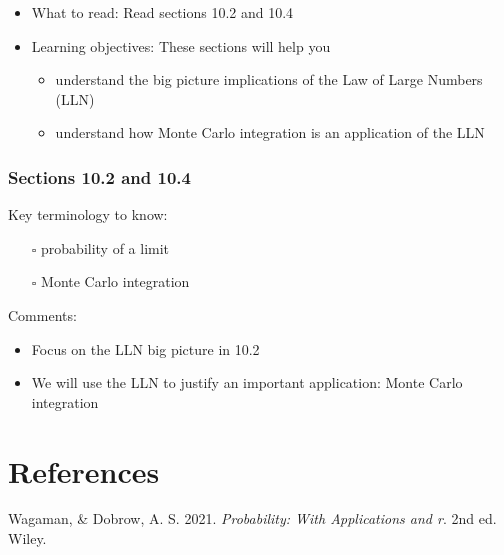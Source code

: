 \documentclass[
  letterpaper,
]{scrbook}
\providecommand{\tightlist}{%
  \setlength{\itemsep}{0pt}\setlength{\parskip}{0pt}}\usepackage{longtable,booktabs,array}
\newlength{\cslhangindent}
\newenvironment{CSLReferences}[2] %
 {\begin{list}{}{%
  \setlength{\itemindent}{0pt}
  \setlength{\leftmargin}{0pt}
  \setlength{\parsep}{0pt}
  \ifodd #1
   \setlength{\leftmargin}{\cslhangindent}
   \setlength{\itemindent}{-1\cslhangindent}
  \fi
  \setlength{\itemsep}{#2\baselineskip}}}
 {\end{list}}
\begin{document}
\begin{itemize}
\item
  What to read: Read sections 10.2 and 10.4
\item
  Learning objectives: These sections will help you

  \begin{itemize}
  \tightlist
  \item
    understand the big picture implications of the Law of Large Numbers
    (LLN)
  \item
    understand how Monte Carlo integration is an application of the LLN
  \end{itemize}
\end{itemize}

\subsection*{Sections 10.2 and 10.4}\label{sections-10.2-and-10.4}

Key terminology to know:

\begin{itemize}
\tightlist
\item[$\square$]
  probability of a limit
\item[$\square$]
  Monte Carlo integration
\end{itemize}

Comments:

\begin{itemize}
\tightlist
\item
  Focus on the LLN big picture in 10.2
\item
  We will use the LLN to justify an important application: Monte Carlo
  integration
\end{itemize}


\chapter*{References}\label{references}


\label{refs}
\begin{CSLReferences}{1}{0}
Wagaman, \& Dobrow, A. S. 2021. \emph{Probability: With Applications and
r}. 2nd ed. Wiley.

\end{CSLReferences}


\backmatter
\end{document}
